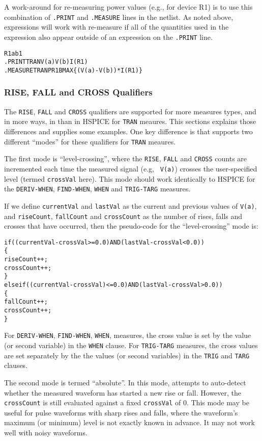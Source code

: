 A work-around for re-measuring power values (e.g., for device R1) is
to use this combination of {\tt .PRINT} and {\tt .MEASURE} lines in
the netlist.  As noted above, expressions will work with re-measure if
all of the quantities used in the expression also appear outside of an
expression on the {\tt .PRINT} line.
\begin{alltt}
R1 a b 1
.PRINT TRAN V(a) V(b) I(R1)
.MEASURE TRAN PR1B MAX \{(V(a)-V(b))*I(R1)\}
\end{alltt}

\subsubsection{RISE, FALL and CROSS Qualifiers}
The \texttt{RISE}, \texttt{FALL} and \texttt{CROSS} qualifiers are
supported for more measures types, and in more ways, in \Xyce{} than
in HSPICE for \texttt{TRAN} meaures.  This sections explains those
differences and supplies some examples.  One key difference is that
\Xyce{} supports two different ``modes'' for these qualifiers for
\texttt{TRAN} meaures.

The first mode is ``level-crossing'', where
the \texttt{RISE}, \texttt{FALL} and \texttt{CROSS} counts are
incremented each time the measured signal (e.g,
\texttt{ V(a)}) crosses the user-specified level (termed
\texttt{crossVal} here).  This mode should work identically to HSPICE
for the \texttt{DERIV-WHEN}, \texttt{FIND-WHEN}, \texttt{WHEN} and
\texttt{TRIG-TARG} measures.

If we define \texttt{currentVal} and \texttt{lastVal} as the current and previous
values of \texttt{V(a)}, and \texttt{riseCount},
\texttt{fallCount} and \texttt{crossCount} as the number of rises, falls and
crosses that have occurred, then the pseudo-code for the ``level-crossing'' mode is:
\begin{alltt}
if ( (currentVal-crossVal >= 0.0) AND (lastVal-crossVal < 0.0) )
\{
  riseCount++;
  crossCount++;
\}
else if( (currentVal-crossVal) <= 0.0) AND (lastVal-crossVal > 0.0) )
\{
  fallCount++;
  crossCount++;
\}
\end{alltt}

For \texttt{DERIV-WHEN}, \texttt{FIND-WHEN}, \texttt{WHEN},
measures, the cross value is set by the value (or second variable) in the
\texttt{WHEN} clause. For \texttt{TRIG-TARG} measures, the cross values are
set separately by the the values (or second variables) in the \texttt{TRIG}
and \texttt{TARG} clauses.

The second mode is termed ``absolute''. In this mode, \Xyce{} attempts
to auto-detect whether the measured waveform has started a new rise or
fall. However, the \texttt{crossCount} is still evaluated against a
fixed \texttt{crossVal} of 0.  This mode may be useful for pulse
waveforms with sharp rises and falls, where the waveform's maximum (or
minimum) level is not exactly known in advance.  It may not work well
with noisy waveforms.  

